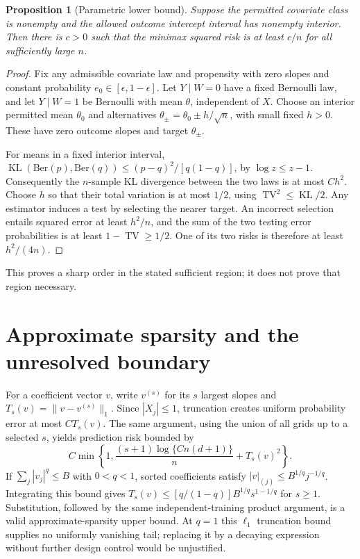 \documentclass[11pt,a4paper]{article}
\newtheorem{proposition}[theorem]{Proposition}
\theoremstyle{definition}
\theoremstyle{remark}
\newcommand{\TV}{\operatorname{TV}}
\begin{document}
\begin{proposition}[Parametric lower bound]
Suppose the permitted covariate class is nonempty and the allowed outcome intercept interval has nonempty interior. Then there is $c>0$ such that the minimax squared risk is at least $c/n$ for all sufficiently large $n$.
\end{proposition}
\begin{proof}
Fix any admissible covariate law and propensity with zero slopes and constant probability $e_0\in[\epsilon,1-\epsilon]$. Let $Y\mid W=0$ have a fixed Bernoulli law, and let $Y\mid W=1$ be Bernoulli with mean $\theta$, independent of $X$. Choose an interior permitted mean $\theta_0$ and alternatives $\theta_\pm=\theta_0\pm h/\sqrt n$, with small fixed $h>0$. These have zero outcome slopes and target $\theta_\pm$.

For means in a fixed interior interval, $\operatorname{KL}(\mathrm{Ber}(p),\mathrm{Ber}(q))\le(p-q)^2/[q(1-q)]$, by $\log z\le z-1$. Consequently the $n$-sample KL divergence between the two laws is at most $C h^2$. Choose $h$ so that their total variation is at most $1/2$, using $\TV^2\le\operatorname{KL}/2$. Any estimator induces a test by selecting the nearer target. An incorrect selection entails squared error at least $h^2/n$, and the sum of the two testing error probabilities is at least $1-\TV\ge1/2$. One of its two risks is therefore at least $h^2/(4n)$.
\end{proof}

This proves a sharp order in the stated sufficient region; it does not prove that region necessary.
\section{Approximate sparsity and the unresolved boundary}
For a coefficient vector $v$, write $v^{(s)}$ for its $s$ largest slopes and $T_s(v)=\|v-v^{(s)}\|_1$. Since $|X_j|\le1$, truncation creates uniform probability error at most $C T_s(v)$. The same argument, using the union of all grids up to a selected $s$, yields prediction risk bounded by
\[
 C\min\left\{1,\frac{(s+1)\log\{C n(d+1)\}}n+T_s(v)^2\right\}.
\]
If $\sum_j|v_j|^q\le B$ with $0<q<1$, sorted coefficients satisfy
$|v|_{(j)}\le B^{1/q}j^{-1/q}$. Integrating this bound gives
$T_s(v)\le [q/(1-q)]B^{1/q}s^{1-1/q}$ for $s\ge1$. Substitution, followed by the same independent-training product argument, is a valid approximate-sparsity upper bound. At $q=1$ this $\ell_1$ truncation bound supplies no uniformly vanishing tail; replacing it by a decaying expression without further design control would be unjustified.
\end{document}
